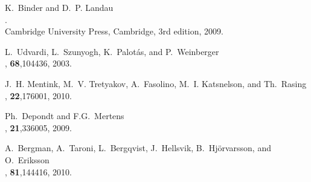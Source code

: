 \documentclass[11pt,fleqn,a4]{book} %
\begin{document}
\begin{thebibliography}{1}
K.~Binder and D.~P. Landau\\
.\\
\newblock Cambridge University Press, Cambridge, 3rd edition, 2009.

L.~Udvardi, L.~Szunyogh, K.~Palot\'as, and P.~Weinberger \\
, \textbf{ 68},104436, 2003.

J.~H. Mentink, M.~V. Tretyakov, A.~Fasolino, M.~I. Katsnelson, and {\relax
  Th}.~Rasing \\
, \textbf{ 22},176001, 2010.

Ph.~Depondt and F.G.~Mertens \\
, \textbf{ 21},336005, 2009.

A.~Bergman, A.~Taroni, L.~Bergqvist, J.~Hellsvik, B.~Hj{\"o}rvarsson, and
  O.~Eriksson \\
, \textbf{ 81},144416, 2010.

\end{thebibliography}


\cleardoublepage
{}
\setlength{\columnsep}{0.75cm}
\printindex

\end{document}
